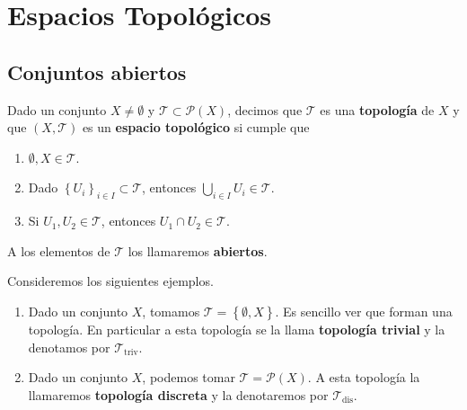 \chapter{Espacios Topológicos}
\section{Conjuntos abiertos}
\begin{definition}[Topología]
Dado un conjunto $\displaystyle X \neq \emptyset $ y $\displaystyle \mathcal{T}\subset \mathcal{P}\left(X\right) $, decimos que $\displaystyle \mathcal{T} $ es una \textbf{topología} de $\displaystyle X $ y que $\displaystyle \left(X, \mathcal{T}\right) $ es un \textbf{espacio topológico} si cumple que 
\begin{enumerate}
\item $\displaystyle \emptyset, X \in \mathcal{T} $.
\item Dado $\displaystyle \left\{ U_{i}\right\} _{i \in I}\subset\mathcal{T} $, entonces $\displaystyle \bigcup_{i \in I}U_{i} \in \mathcal{T} $.
\item Si $\displaystyle U_{1}, U_{2} \in \mathcal{T} $, entonces $\displaystyle U_{1} \cap U_{2} \in \mathcal{T} $.
\end{enumerate}
\end{definition}
\begin{notation}
A los elementos de $\displaystyle \mathcal{T} $ los llamaremos \textbf{abiertos}.
\end{notation}
\begin{eg}
	Consideremos los siguientes ejemplos.
	\begin{enumerate}
	\item Dado un conjunto $\displaystyle X $, tomamos $\displaystyle \mathcal{T}= \left\{ \emptyset, X\right\}  $. Es sencillo ver que forman una topología. En particular a esta topología se la llama \textbf{topología trivial} y la denotamos por $\displaystyle \mathcal{T}_{\text{triv}} $.
	\item Dado un conjunto $\displaystyle X $, podemos tomar $\displaystyle \mathcal{T} = \mathcal{P}\left(X\right) $. A esta topología la llamaremos \textbf{topología discreta} y la denotaremos por $\displaystyle \mathcal{T}_{\text{dis}} $.
	\end{enumerate}
\end{eg}
